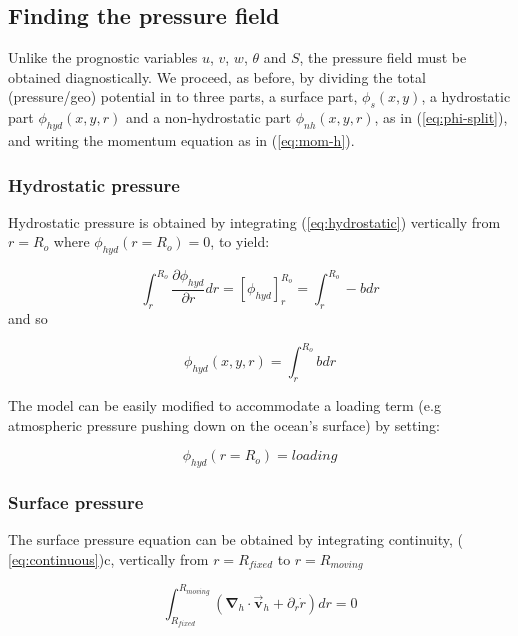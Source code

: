 \documentclass[12pt]{book}
\begin{document}
\subsection{Finding the pressure field}

Unlike the prognostic variables $u$, $v$, $w$, $\theta $ and $S$, the
pressure field must be obtained diagnostically. We proceed, as before, by
dividing the total (pressure/geo) potential in to three parts, a surface
part, $\phi _{s}(x,y)$, a hydrostatic part $\phi _{hyd}(x,y,r)$ and a
non-hydrostatic part $\phi _{nh}(x,y,r)$, as in (\ref{eq:phi-split}), and
writing the momentum equation as in (\ref{eq:mom-h}).

\subsubsection{Hydrostatic pressure}

Hydrostatic pressure is obtained by integrating (\ref{eq:hydrostatic})
vertically from $r=R_{o}$ where $\phi _{hyd}(r=R_{o})=0$, to yield:

\begin{equation*}
\int_{r}^{R_{o}}\frac{\partial \phi _{hyd}}{\partial r}dr=\left[ \phi _{hyd}
\right] _{r}^{R_{o}}=\int_{r}^{R_{o}}-bdr
\end{equation*}
and so

\begin{equation}
\phi _{hyd}(x,y,r)=\int_{r}^{R_{o}}bdr  \label{eq:hydro-phi}
\end{equation}

The model can be easily modified to accommodate a loading term (e.g
atmospheric pressure pushing down on the ocean's surface) by setting:

\begin{equation}
\phi _{hyd}(r=R_{o})=loading  \label{eq:loading}
\end{equation}

\subsubsection{Surface pressure}

The surface pressure equation can be obtained by integrating continuity, (
\ref{eq:continuous})c, vertically from $r=R_{fixed}$ to $r=R_{moving}$

\begin{equation*}
\int_{R_{fixed}}^{R_{moving}}\left( \mathbf{\nabla }_{h}\cdot \vec{\mathbf{v}
}_{h}+\partial _{r}\dot{r}\right) dr=0
\end{equation*}
\end{document}
